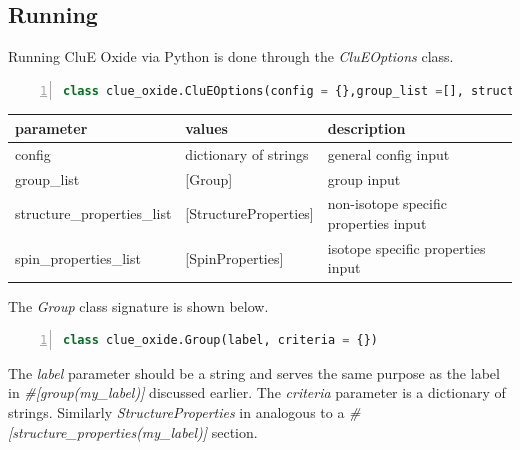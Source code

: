 \documentclass{book}
\begin{document}
\subsection{Running}
Running CluE Oxide via Python is done through the \textit{CluEOptions} class.
\begin{lstlisting}[frame=single,numbers=left,language=python]
class clue_oxide.CluEOptions(config = {},group_list =[], structure_properties_list = [], spin_properties_list = [])
\end{lstlisting}

\begin{center}
\begin{tabular}{| m{12em} | m{3.5cm}| m{7cm} |}
 \hline 
 \textbf{parameter} & \textbf{values} & \textbf{description} \\ 
 \hline
 config & dictionary of strings & general config input\\
 \hline
 group\_list & [Group] & group input\\ 
 \hline
 structure\_properties\_list & [StructureProperties] & 
 non-isotope specific properties input\\ 
 \hline
 spin\_properties\_list & [SpinProperties] & 
 isotope specific properties input\\ 
 \hline 
\end{tabular}
\end{center}
The \textit{Group} class signature is shown below.
\begin{lstlisting}[frame=single,numbers=left,language=python]
class clue_oxide.Group(label, criteria = {})
\end{lstlisting}
The \textit{label} parameter should be a string and serves the same purpose as 
the label in \textit{\#[group(my\_label)]} discussed earlier.
The \textit{criteria} parameter is a dictionary of strings.
Similarly \textit{StructureProperties} in analogous to a 
\textit{\#[structure\_properties(my\_label)]} section.
\end{document}
